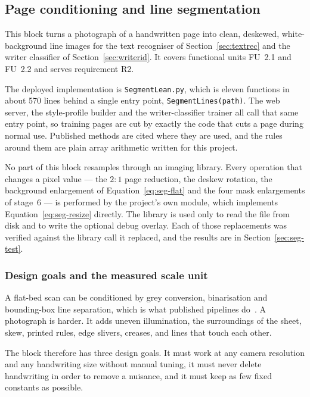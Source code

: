 \subsection{Page conditioning and line segmentation}
\label{sec:segmentation}

This block turns a photograph of a handwritten page into clean, deskewed, white-background line images for the text recogniser of Section~\ref{sec:textrec} and the writer classifier of Section~\ref{sec:writerid}. It covers functional units FU~2.1 and FU~2.2 and serves requirement R2.

The deployed implementation is \texttt{SegmentLean.py}, which is eleven functions in about 570 lines behind a single entry point, \texttt{SegmentLines(path)}. The web server, the style-profile builder and the writer-classifier trainer all call that same entry point, so training pages are cut by exactly the code that cuts a page during normal use. Published methods are cited where they are used, and the rules around them are plain array arithmetic written for this project.

No part of this block resamples through an imaging library. Every operation that changes a pixel value --- the $2{:}1$ page reduction, the deskew rotation, the background enlargement of Equation~\ref{eq:seg-flat} and the four mask enlargements of stage~6 --- is performed by the project's own module, which implements Equation~\ref{eq:seg-resize} directly. The library is used only to read the file from disk and to write the optional debug overlay. Each of those replacements was verified against the library call it replaced, and the results are in Section~\ref{sec:seg-test}.

\subsubsection{Design goals and the measured scale unit}

A flat-bed scan can be conditioned by grey conversion, binarisation and bounding-box line separation, which is what published pipelines do~\cite{hemanth2022,chen2023}. A photograph is harder. It adds uneven illumination, the surroundings of the sheet, skew, printed rules, edge slivers, creases, and lines that touch each other.

The block therefore has three design goals. It must work at any camera resolution and any handwriting size without manual tuning, it must never delete handwriting in order to remove a nuisance, and it must keep as few fixed constants as possible.

